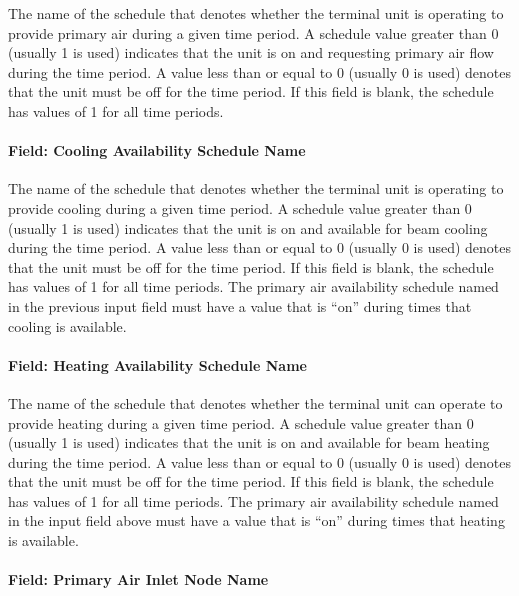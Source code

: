 The name of the schedule that denotes whether the terminal unit is operating to provide primary air during a given time period. A schedule value greater than 0 (usually 1 is used) indicates that the unit is on and requesting primary air flow during the time period. A value less than or equal to 0 (usually 0 is used) denotes that the unit must be off for the time period. If this field is blank, the schedule has values of 1 for all time periods.

\paragraph{Field: Cooling Availability Schedule Name}\label{field-cooling-availability-schedule-name}

The name of the schedule that denotes whether the terminal unit is operating to provide cooling during a given time period. A schedule value greater than 0 (usually 1 is used) indicates that the unit is on and available for beam cooling during the time period. A value less than or equal to 0 (usually 0 is used) denotes that the unit must be off for the time period. If this field is blank, the schedule has values of 1 for all time periods. The primary air availability schedule named in the previous input field must have a value that is ``on'' during times that cooling is available.

\paragraph{Field: Heating Availability Schedule Name}\label{field-heating-availability-schedule-name}

The name of the schedule that denotes whether the terminal unit can operate to provide heating during a given time period. A schedule value greater than 0 (usually 1 is used) indicates that the unit is on and available for beam heating during the time period. A value less than or equal to 0 (usually 0 is used) denotes that the unit must be off for the time period. If this field is blank, the schedule has values of 1 for all time periods. The primary air availability schedule named in the input field above must have a value that is ``on'' during times that heating is available.

\paragraph{Field: Primary Air Inlet Node Name}\label{field-primary-air-inlet-node-name}

